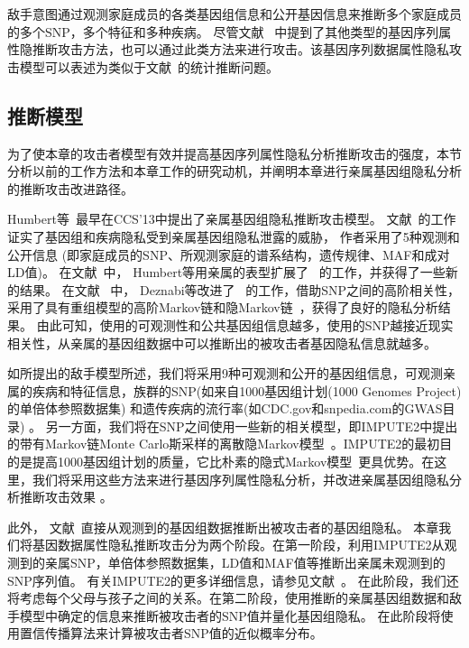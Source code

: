 敌手意图通过观测家庭成员的各类基因组信息和公开基因信息来推断多个家庭成员的多个SNP，多个特征和多种疾病。 尽管文献~\cite{humbert2013addressing} 中提到了其他类型的基因序列属性隐推断攻击方法，也可以通过此类方法来进行攻击。该基因序列数据属性隐私攻击模型可以表述为类似于文献~\cite{humbert2013addressing,humbert2017quantifying,deznabi2018inference}的统计推断问题。

\subsection{推断模型}

为了使本章的攻击者模型有效并提高基因序列属性隐私分析推断攻击的强度，本节分析以前的工作方法和本章工作的研究动机，并阐明本章进行亲属基因组隐私分析的推断攻击改进路径。

Humbert等~\cite{humbert2013addressing}最早在CCS'13中提出了亲属基因组隐私推断攻击模型。 文献~\cite{humbert2013addressing}的工作证实了基因组和疾病隐私受到亲属基因组隐私泄露的威胁， 作者采用了5种观测和公开信息 (即家庭成员的SNP、所观测家庭的谱系结构，遗传规律、MAF和成对LD值)。 在文献~\cite{humbert2017quantifying}中， Humbert等用亲属的表型扩展了~\cite{humbert2013addressing} 的工作，并获得了一些新的结果。
在文献~\cite{deznabi2018inference} 中， Deznabi等改进了~\cite{humbert2013addressing} 的工作，借助SNP之间的高阶相关性，采用了具有重组模型的高阶Markov链和隐Markov链~\cite{marchini2007newa,samani2015quantifying}，获得了良好的隐私分析结果。
由此可知，使用的可观测性和公共基因组信息越多，使用的SNP越接近现实相关性，从亲属的基因组数据中可以推断出的被攻击者基因隐私信息就越多。

如所提出的敌手模型所述，我们将采用9种可观测和公开的基因组信息，可观测亲属的疾病和特征信息，族群的SNP(如来自1000基因组计划(1000 Genomes Project)的单倍体参照数据集) 和遗传疾病的流行率(如CDC.gov和snpedia.com的GWAS目录) 。 另一方面，我们将在SNP之间使用一些新的相关模型，即IMPUTE2中提出的带有Markov链Monte Carlo斯采样的离散隐Markov模型~\cite{howie2014impute2}。IMPUTE2的最初目的是提高1000基因组计划的质量，它比朴素的隐式Markov模型~\cite{marchini2007newa,samani2015quantifying}更具优势。在这里，我们将采用这些方法来进行基因序列属性隐私分析，并改进亲属基因组隐私分析推断攻击效果 。

此外， 文献~\cite{humbert2013addressing,humbert2017quantifying,deznabi2018inference}直接从观测到的基因组数据推断出被攻击者的基因组隐私。 本章我们将基因数据属性隐私推断攻击分为两个阶段。在第一阶段，利用IMPUTE2从观测到的亲属SNP，单倍体参照数据集，LD值和MAF值等推断出亲属未观测到的SNP序列值。 有关IMPUTE2的更多详细信息，请参见文献~\cite{howie2014impute2}。
在此阶段，我们还将考虑每个父母与孩子之间的关系。在第二阶段，使用推断的亲属基因组数据和敌手模型中确定的信息来推断被攻击者的SNP值并量化基因组隐私。 在此阶段将使用置信传播算法来计算被攻击者SNP值的近似概率分布。

